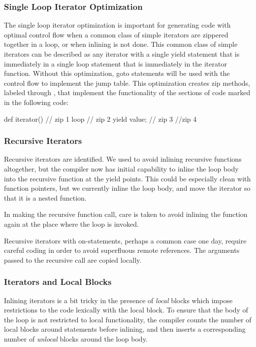 \documentclass[10pt]{article}
\begin{document}
\subsubsection{Single Loop Iterator Optimization}

The single loop iterator optimization is important for generating code
with optimal control flow when a common class of simple iterators are
zippered together in a loop, or when inlining is not done.  This
common class of simple iterators can be described as any iterator with
a single yield statement that is immediately in a single loop
statement that is immediately in the iterator function.  Without this
optimization, goto statements will be used with the control flow to
implement the jump table.  This optimization creates zip methods,
labeled  through , that implement the functionality
of the sections of code marked in the following code:
\begin{chapel}
def iterator() {
  // zip 1
  loop {
    // zip 2
    yield value;
    // zip 3
  }
  //zip 4
}
\end{chapel}

\subsubsection{Recursive Iterators}

Recursive iterators are identified.  We used to avoid inlining
recursive functions altogether, but the compiler now has initial
capability to inline the loop body into the recursive function at the
yield points.  This could be especially clean with function pointers,
but we currently inline the loop body, and move the iterator so that
it is a nested function.

In making the recursive function call, care is taken to avoid inlining
the function again at the place where the loop is invoked.

Recursive iterators with on-statements, perhaps a common case one day,
require careful coding in order to avoid superfluous remote
references.  The arguments passed to the recursive call are copied
locally.

\subsubsection{Iterators and Local Blocks}

Inlining iterators is a bit tricky in the presence of \emph{local}
blocks which impose restrictions to the code lexically with the local
block.  To ensure that the body of the loop is not restricted to local
functionality, the compiler counts the number of local blocks around
 statements before inlining, and then inserts a
corresponding number of \emph{unlocal} blocks around the loop body.
\end{document}
